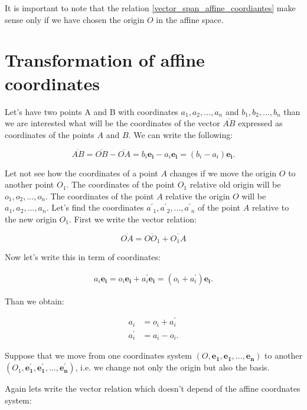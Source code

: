 \documentclass{book}
\begin{document}
It is important to note that the relation \eqref{vector_span_affine_coordiantes} make sense only if we have chosen the origin $O$ in the affine space.

\section{Transformation of affine coordinates}

Let's have two points A and B with coordinates ${a_1, a_2, ..., a_n}$ and ${b_1, b_2, ..., b_n}$ than we are interested what will be the coordinates of the vector $\overline{AB}$ expressed as coordinates of the points $A$ and $B$. We can write the following:

\[\overline{AB} = \overline{OB} - \overline{OA} = b_i\boldsymbol{e_i} - a_i\boldsymbol{e_i} = (b_i - a_i)\boldsymbol{e_i}. \] 

Let not see how the coordinates of a point $A$ changes if we move the origin $O$ to another point $O_1$. The coordinates of the point $O_1$ relative old origin will be ${o_1, o_2, ..., o_n}$. The coordinates of the point $A$ relative the origin $O$ will be ${a_1, a_2, ..., a_n}$. Let's find the coordinates ${a{^'}_1, a{^'}_2, ..., a{^'}_n}$ of the point $A$ relative to the new origin $O_1$. First we write the vector relation:

\[\overline{OA} = \overline{OO_1} + \overline{O_1A}\]

Now let's write this in term of coordinates:

\begin{align}
a_i\boldsymbol{e_i} = o_i\boldsymbol{e_i} + a^{'}_i\boldsymbol{e_i} = (o_i + a^{'}_i)\boldsymbol{e_i}.\label{affine_transfrom}
\end{align}

Than we obtain:

\begin{align}
a_i &= o_i + a^{'}_i \label{affine_origin_move} \\
a^{'}_i &= a_i - o_i. \label{affine_origin_move1}
\end{align}

Suppose that we move from one coordinates system $(O, \boldsymbol{e_1}, \boldsymbol{e_1}, ..., \boldsymbol{e_n})$ to another $(O_1, \boldsymbol{e^{'}_1}, \boldsymbol{e^{'}_1}, ..., \boldsymbol{e^{'}_n})$, i.e. we change not only the origin but also the basis.

Again lets write the vector relation which doesn't depend of the affine coordnates system:
\end{document}
